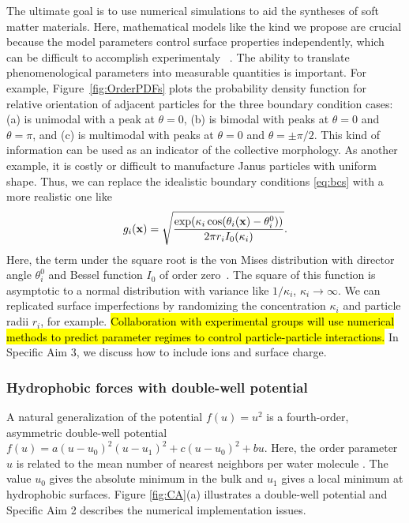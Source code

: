 The ultimate goal is to use numerical simulations to aid
the syntheses of soft matter materials.
Here, mathematical models like the kind we propose are crucial
because the model parameters control surface properties independently, 
which can be difficult to accomplish experimentaly 
~\cite{Bradley2016,Mallory2017,Bradley2017}.
The ability to translate phenomenological parameters
into measurable quantities is important. 
For example, Figure~\ref{fig:OrderPDFs} plots
the probability density function for 
relative orientation of adjacent particles
for the three boundary condition cases:
(a) is unimodal with a peak at $\theta = 0$,
(b) is bimodal with peaks at $\theta = 0$ and $\theta = \pi$,
and (c) is multimodal with peaks at $\theta = 0$ and $\theta = \pm \pi/2$.
This kind of information can be used as an indicator
of the collective morphology. As another example,
it is costly or difficult to manufacture
Janus particles with uniform shape.
Thus, we can replace the idealistic boundary
conditions \eqref{eq:bcs} with a more realistic one like
\begin{equation}
\label{eq:vonMises}
  g_i(\mathbf{x}) = \sqrt{
  \frac{\exp( \kappa_i\cos(\theta_i(\mathbf{x}) - \theta^0_i))}
  {2\pi r_i I_0(\kappa_i)}}.
\end{equation}
Here, the term under the square root is the von Mises distribution with
director angle $\theta^0_i$ and Bessel function $I_0$ of order zero~\cite{Fisher_1993}.
The square of this function is asymptotic to a normal distribution with variance
like $1/\kappa_i$, $\kappa_i \to \infty$. We can replicated surface imperfections
by randomizing the concentration $\kappa_i$ and particle radii $r_i$,
for example. \hl{Collaboration with experimental groups will
use numerical methods to predict parameter regimes 
to control particle-particle interactions.}
In Specific Aim 3, we discuss how to include ions and surface charge. 





\subsubsection{Hydrophobic forces with double-well potential}
A natural generalization of the potential $f(u) = u^2$
is a fourth-order, asymmetric double-well potential
$f(u) = a(u-u_0)^2(u-u_1)^2 + c(u-u_0)^2 + bu$.
Here, the order parameter $u$ is related to
the mean number of nearest neighbors
per water molecule \cite{GoHaKo94}.
The value $u_0$ gives the absolute minimum in the bulk
and $u_1$ gives a local minimum at hydrophobic surfaces.
Figure \ref{fig:CA}(a) illustrates a double-well potential
and Specific Aim 2 describes the numerical implementation issues.

